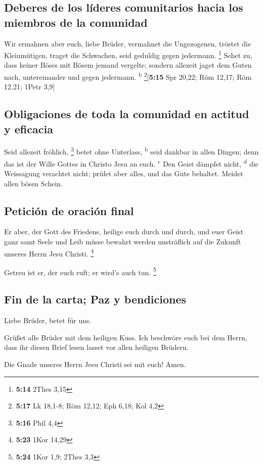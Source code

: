\hypertarget{deberes-de-los-luxedderes-comunitarios-hacia-los-miembros-de-la-comunidad}{%
\subsection{Deberes de los líderes comunitarios hacia los miembros de la
comunidad}\label{deberes-de-los-luxedderes-comunitarios-hacia-los-miembros-de-la-comunidad}}

 Wir ermahnen aber euch, liebe Brüder, vermahnet die
Ungezogenen, tröstet die Kleinmütigen, traget die Schwachen, seid
geduldig gegen jedermann. \footnote{\textbf{5:14} 2Thes 3,15}
 Sehet zu, dass keiner Böses mit Bösem jemand vergelte;
sondern allezeit jaget dem Guten nach, untereinander und gegen
jedermann. \textsuperscript{b} \footnote{\textbf{5:17} Lk 18,1-8; Röm
  12,12; Eph 6,18; Kol 4,2}{[}\textbf{5:15} Spr 20,22; Röm 12,17; Röm
12,21; 1Petr 3,9{]}

\hypertarget{obligaciones-de-toda-la-comunidad-en-actitud-y-eficacia}{%
\subsection{Obligaciones de toda la comunidad en actitud y
eficacia}\label{obligaciones-de-toda-la-comunidad-en-actitud-y-eficacia}}

 Seid allezeit fröhlich, \footnote{\textbf{5:16} Phil 4,4}
 betet ohne Unterlass, \textsuperscript{b}
 seid dankbar in allen Dingen; denn das ist der Wille
Gottes in Christo Jesu an euch. \textsuperscript{c}  Den
Geist dämpfet nicht, \textsuperscript{d}  die Weissagung
verachtet nicht;  prüfet aber alles, und das Gute
behaltet.  Meidet allen bösen Schein.

\hypertarget{peticiuxf3n-de-oraciuxf3n-final}{%
\subsection{Petición de oración
final}\label{peticiuxf3n-de-oraciuxf3n-final}}

 Er aber, der Gott des Friedens, heilige euch durch und
durch, und euer Geist ganz samt Seele und Leib müsse bewahrt werden
unsträflich auf die Zukunft unseres Herrn Jesu Christi. \footnote{\textbf{5:23}
  1Kor 14,29}

 Getreu ist er, der euch ruft; er wird's auch tun.
\footnote{\textbf{5:24} 1Kor 1,9; 2Thes 3,3}

\hypertarget{fin-de-la-carta-paz-y-bendiciones}{%
\subsection{Fin de la carta; Paz y
bendiciones}\label{fin-de-la-carta-paz-y-bendiciones}}

 Liebe Brüder, betet für uns.

 Grüßet alle Brüder mit dem heiligen Kuss.
 Ich beschwöre euch bei dem Herrn, dass ihr diesen Brief
lesen lasset vor allen heiligen Brüdern.

 Die Gnade unseres Herrn Jesu Christi sei mit euch! Amen.
